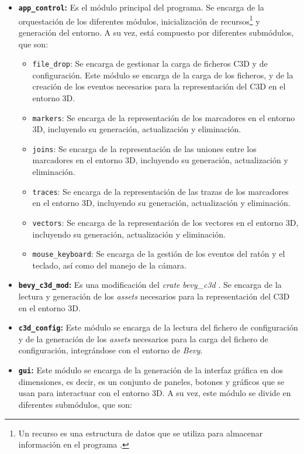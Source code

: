 \begin{itemize}
    \item \textbf{\texttt{app\_control}:} Es el módulo principal del programa. Se encarga de la orquestación de los diferentes módulos, inicialización de recursos\footnote{Un recurso es una estructura de datos que se utiliza para almacenar información en el programa \autocite{Resources,ResourcesUnofficialBevy}.} y generación del entorno. A su vez, está compuesto por diferentes submódulos, que son:
    \begin{itemize}
        \item \texttt{file\_drop}: Se encarga de gestionar la carga de ficheros \ac{C3D} y de configuración. Este módulo se encarga de la carga de los ficheros, y de la creación de los eventos necesarios para la representación del \ac{C3D} en el entorno 3D.
        \item \texttt{markers}: Se encarga de la representación de los marcadores en el entorno 3D, incluyendo su generación, actualización y eliminación.
        \item \texttt{joins}: Se encarga de la representación de las uniones entre los marcadores en el entorno 3D, incluyendo su generación, actualización y eliminación. 
        \item \texttt{traces}: Se encarga de la representación de las trazas de los marcadores en el entorno 3D, incluyendo su generación, actualización y eliminación.
        \item \texttt{vectors}: Se encarga de la representación de los vectores en el entorno 3D, incluyendo su generación, actualización y eliminación.
        \item \texttt{mouse\_keyboard}: Se encarga de la gestión de los eventos del ratón y el teclado, así como del manejo de la cámara.
    \end{itemize}
    \item \textbf{\texttt{bevy\_c3d\_mod}:} Es una modificación del \textit{crate} \textit{bevy\_c3d} \autocite{BiomechanicsfoundationBevy_c3d2024}. Se encarga de la lectura y generación de los \textit{assets} necesarios para la representación del \ac{C3D} en el entorno 3D. 
    \item \textbf{\texttt{c3d\_config}:} Este módulo se encarga de la lectura del fichero de configuración y de la generación de los \textit{assets} necesarios para la carga del fichero de configuración, integrándose con el entorno de \textit{Bevy}.
    \item \textbf{\texttt{gui}:} Este módulo se encarga de la generación de la interfaz gráfica en dos dimensiones, es decir, es un conjunto de paneles, botones y gráficos que se usan para interactuar con el entorno 3D. A su vez, este módulo se divide en diferentes submódulos, que son:

\end{itemize}
